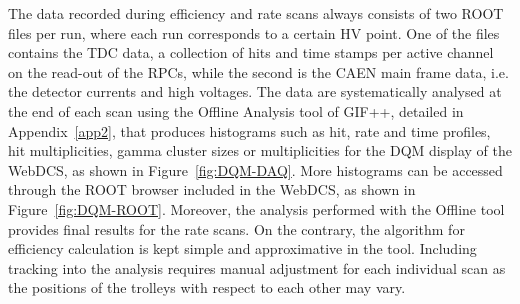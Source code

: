 	The data recorded during efficiency and rate scans always consists of two ROOT files per run, where each run corresponds to a certain HV point. One of the files contains the TDC data, a collection of hits and time stamps per active channel on the read-out of the RPCs, while the second is the CAEN main frame data, i.e. the detector currents and high voltages. The data are systematically analysed at the end of each scan using the Offline Analysis tool of GIF++, detailed in Appendix~\ref{app2}, that produces histograms such as hit, rate and time profiles, hit multiplicities, gamma cluster sizes or multiplicities for the DQM display of the WebDCS, as shown in Figure~\ref{fig:DQM-DAQ}. More histograms can be accessed through the ROOT browser included in the WebDCS, as shown in Figure~\ref{fig:DQM-ROOT}. Moreover, the analysis performed with the Offline tool provides final results for the rate scans. On the contrary, the algorithm for efficiency calculation is kept simple and approximative in the tool. Including tracking into the analysis requires manual adjustment for each individual scan as the positions of the trolleys with respect to each other may vary.

